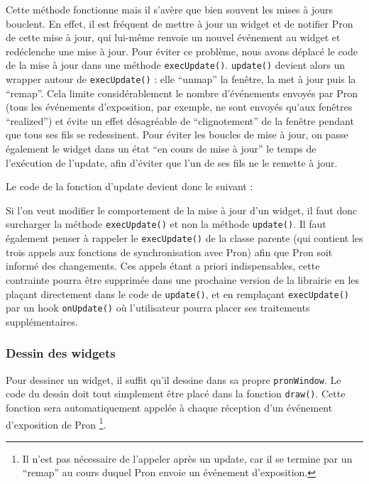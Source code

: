 Cette méthode fonctionne mais il s'avère que bien souvent les mises à jours bouclent.
En effet, il est fréquent de mettre à jour un widget et de notifier Pron de cette mise à jour, qui lui-même renvoie un nouvel événement au widget et redéclenche une mise à jour.
Pour éviter ce problème, nous avons déplacé le code de la mise à jour dans une méthode \verb|execUpdate()|. \verb|update()| devient alors un wrapper autour de \verb|execUpdate()| : elle ``unmap'' la fenêtre, la met à jour puis la ``remap''.
Cela limite considérablement le nombre d'événements envoyés par Pron (tous les événements d'exposition, par exemple, ne sont envoyés qu'aux fenêtres ``realized'') et évite un effet désagréable de ``clignotement'' de la fenêtre pendant que tous ses fils se redessinent.
Pour éviter les boucles de mise à jour, on passe également le widget dans un état ``en cours de mise à jour'' le temps de l'exécution de l'update, afin d'éviter que l'un de ses fils ne le remette à jour.

Le code de la fonction d'update devient donc le suivant :



Si l'on veut modifier le comportement de la mise à jour d'un widget, il faut donc surcharger la méthode \verb|execUpdate()| et non la méthode \verb|update()|. Il faut également penser à rappeler le \verb|execUpdate()| de la classe parente (qui contient les trois appels aux fonctions de synchronisation avec Pron) afin que Pron soit informé des changements. Ces appels étant a priori indispensables, cette contrainte pourra être supprimée dans une prochaine version de la librairie en les plaçant directement dans le code de \verb|update()|, et en remplaçant \verb|execUpdate()| par un hook \verb|onUpdate()| où l'utilisateur pourra placer ses traitements supplémentaires.

\subsubsection{Dessin des widgets}

Pour dessiner un widget, il suffit qu'il dessine dans sa propre \verb|pronWindow|.
Le code du dessin doit tout simplement être placé dans la fonction \verb|draw()|.
Cette fonction sera automatiquement appelée à chaque réception d'un événement d'exposition de Pron
\footnote{Il n'est pas nécessaire de l'appeler après un update, car il se termine par un ``remap'' au cours duquel Pron envoie un événement d'exposition.}.

